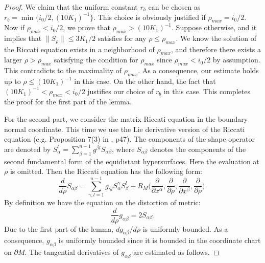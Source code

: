 \documentclass[11pt,letterpaper]{amsart}
\numberwithin{equation}{section}
\theoremstyle{definition}
\theoremstyle{plain}
\theoremstyle{definition}
\theoremstyle{plain}
\theoremstyle{definition}
\theoremstyle{plain}
\begin{document}
\begin{proof}
We claim that the uniform constant $r_b$ can be chosen as $r_b=\min\{i_0/2,(10K_1)^{-1}\}$. This choice is obviously justified if $\rho_{max}=i_0/2$. Now if $\rho_{max}<i_0/2$, we prove that $\rho_{max}> (10K_1)^{-1}$. Suppose otherwise, and it implies that $\|S_{\rho}\|\leqslant 3K_1/2$ satisfies for any $\rho\leqslant \rho_{max}$. We know the solution of the Riccati equation exists in a neighborhood of $\rho_{max}$, and therefore there exists a larger $\rho>\rho_{max}$ satisfying the condition for $\rho_{max}$ since $\rho_{max}< i_0/2$ by assumption. This contradicts to the maximality of $\rho_{max}$. As a consequence, our estimate holds up to $\rho\leqslant (10K_1)^{-1}$ in this case. On the other hand, the fact that $(10K_1)^{-1}<\rho_{max}<i_0/2$ justifies our choice of $r_b$ in this case. This completes the proof for the first part of the lemma.

\smallskip
For the second part, we consider the matrix Riccati equation in the boundary normal coordinate. This time we use the Lie derivative version of the Riccati equation (e.g. Proposition 7(3) in \cite{PP}, p47). 
The components of the shape operator are denoted by $S_{\alpha}^{l}=\sum_{\beta=1}^{n-1} g^{\beta l}S_{\alpha \beta}$, where $S_{\alpha \beta}$ denotes the components of the second fundamental form of the equidistant hypersurfaces. Here the evaluation at $\rho$ is omitted. Then the Riccati equation has the following form:
$$\frac{d}{d \rho} S_{\alpha\beta}=\sum_{\gamma,l=1}^{n-1} g_{\gamma l}S_{\alpha}^{\gamma}S_{\beta}^{l}+R_M \big(\frac{\partial}{\partial x^{\alpha}}, \frac{\partial}{\partial \rho}, \frac{\partial}{\partial x^{\beta}}, \frac{\partial}{\partial \rho} \big).$$
By definition we have the equation on the distortion of metric:
$$\frac{d}{d \rho} g_{\alpha\beta}=2S_{\alpha\beta}.$$
Due to the first part of the lemma, $d g_{\alpha\beta}/d\rho$ is uniformly bounded. As a consequence, $g_{\alpha\beta}$ is uniformly bounded since it is bounded in the coordinate chart on $\partial M$. The tangential derivatives of $g_{\alpha\beta}$ are estimated as follows.


\end{proof}
\end{document}
